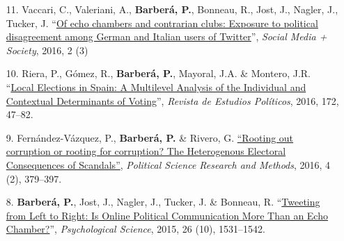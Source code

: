 \documentclass[margin,line,11pt]{resume}
\begin{document}
\begin{resume}
\begin{itemize}[leftmargin=5.5mm]
\item[11.] Vaccari, C., Valeriani, A., \textbf{Barber\'{a}, P.}, Bonneau, R., Jost, J., Nagler, J., Tucker, J. ``\href{http://sms.sagepub.com/content/2/3/2056305116664221.abstract}{Of echo chambers and contrarian clubs: Exposure to political disagreement among German and Italian users of Twitter}'', \textit{Social Media + Society}, 2016, 2 (3)

\newpage

\item[10.] Riera, P., G\'{o}mez, R., \textbf{Barber\'{a}, P.}, Mayoral, J.A. \& Montero, J.R. ``\href{http://www.cepc.gob.es/publicaciones/revistas/revistaselectronicas?IDR=3&IDN=1360&IDA=37721}{Local Elections in Spain: A Multilevel Analysis of the Individual and Contextual Determinants of Voting}'', \textit{Revista de Estudios Pol\'{i}ticos}, 2016, 172, 47--82.

\item[9.] Fern\'{a}ndez-V\'{a}zquez, P., \textbf{Barber\'{a}, P.} \& Rivero, G. \href{http://dx.doi.org/10.1017/psrm.2015.8}{``Rooting out corruption or rooting for corruption? The Heterogenous Electoral Consequences of Scandals''}, \textit{Political Science Research and Methods}, 2016, 4 (2), 379--397.

\item[8.] \textbf{Barber\'{a}, P.}, Jost, J., Nagler, J., Tucker, J. \& Bonneau, R. ``\href{http://pss.sagepub.com/content/early/2015/08/21/0956797615594620}{Tweeting from Left to Right: Is Online Political Communication More Than an Echo Chamber?}'', \textit{Psychological Science}, 2015, 26 (10), 1531--1542.


\end{itemize}
\end{resume}
\end{document}
